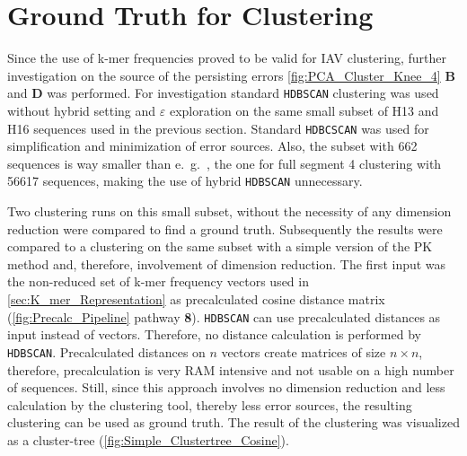 \section{Ground Truth for Clustering} \label{sec:Comparison_Clustering}

Since the use of k-mer frequencies proved to be valid for \gls{IAV} clustering, further investigation on the source of the persisting errors \autoref{fig:PCA_Cluster_Knee_4} \textbf{\textsf{B}} and \textbf{\textsf{D}} was performed. For investigation standard \texttt{HDBSCAN} clustering was used without hybrid setting and $\varepsilon$ exploration on the same small subset of H13 and H16 sequences used in the previous section. Standard \texttt{HDBCSCAN} was used for simplification and minimization of error sources. Also, the subset with 662 sequences is way smaller than e.~g.~, the one for full segment 4 clustering with 56617 sequences, making the use of hybrid \texttt{HDBSCAN} unnecessary. 

\vspace{1em}

Two clustering runs on this small subset, without the necessity of any dimension reduction were compared to find a ground truth. Subsequently the results were compared to a clustering on the same subset with a simple version of the PK method and, therefore, involvement of dimension reduction. The first input was the non-reduced set of k-mer frequency vectors used in \autoref{sec:K_mer_Representation} as precalculated cosine distance matrix (\autoref{fig:Precalc_Pipeline} pathway \textsf{\textbf{8}}). \texttt{HDBSCAN} can use precalculated distances as input instead of vectors. Therefore, no distance calculation is performed by \texttt{HDBSCAN}. Precalculated distances on $n$ vectors create matrices of size $n \times n$, therefore, precalculation is very RAM intensive and not usable on a high number of sequences. Still, since this approach involves no dimension reduction and less calculation by the clustering tool, thereby less error sources, the resulting clustering can be used as ground truth. The result of the clustering was visualized as a cluster-tree (\autoref{fig:Simple_Clustertree_Cosine}). 

